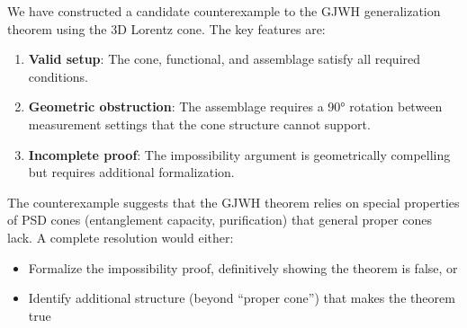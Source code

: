 \documentclass[11pt,a4paper]{article}
\theoremstyle{definition}
\begin{document}
We have constructed a candidate counterexample to the GJWH generalization theorem using the 3D Lorentz cone. The key features are:

\begin{enumerate}
    \item \textbf{Valid setup}: The cone, functional, and assemblage satisfy all required conditions.

    \item \textbf{Geometric obstruction}: The assemblage requires a 90° rotation between measurement settings that the cone structure cannot support.

    \item \textbf{Incomplete proof}: The impossibility argument is geometrically compelling but requires additional formalization.
\end{enumerate}

The counterexample suggests that the GJWH theorem relies on special properties of PSD cones (entanglement capacity, purification) that general proper cones lack. A complete resolution would either:
\begin{itemize}
    \item Formalize the impossibility proof, definitively showing the theorem is false, or
    \item Identify additional structure (beyond ``proper cone'') that makes the theorem true
\end{itemize}
\end{document}
